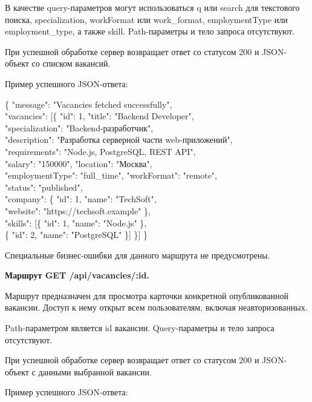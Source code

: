 В качестве query-параметров могут использоваться q или search для текстового поиска, specialization, workFormat или work\_format, employmentType или employment\_type, а также skill. Path-параметры и тело запроса отсутствуют.

При успешной обработке сервер возвращает ответ со статусом 200 и JSON-объект со списком вакансий.

Пример успешного JSON-ответа:

\begin{flushleft}
	\small\ttfamily
	\{ "message": "Vacancies fetched successfully",\\
	"vacancies": [\{ "id": 1, "title": "Backend Developer",\\
	"specialization": "Backend-разработчик",\\
	"description": "Разработка серверной части web-приложений",\\
	"requirements": "Node.js, PostgreSQL, REST API",\\
	"salary": "150000", "location": "Москва",\\
	"employmentType": "full\_time", "workFormat": "remote",\\
	"status": "published",\\
	"company": \{ "id": 1, "name": "TechSoft",\\
	"website": "https://techsoft.example" \},\\
	"skills": [\{ "id": 1, "name": "Node.js" \},\\
	\{ "id": 2, "name": "PostgreSQL" \}] \}] \}
\end{flushleft}

Специальные бизнес-ошибки для данного маршрута не предусмотрены.

\textbf{Маршрут GET /api/vacancies/:id.}

Маршрут предназначен для просмотра карточки конкретной опубликованной вакансии. Доступ к нему открыт всем пользователям, включая неавторизованных.

Path-параметром является id вакансии. Query-параметры и тело запроса отсутствуют.

При успешной обработке сервер возвращает ответ со статусом 200 и JSON-объект с данными выбранной вакансии.

Пример успешного JSON-ответа:

